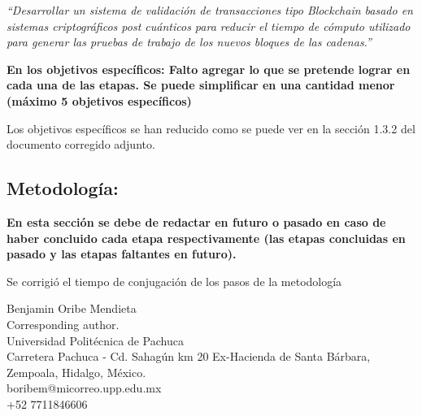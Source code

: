 \documentclass[10pt,a4paper,roman]{moderncv}        %
\begin{document}
\hfill \break 
 \textit{``Desarrollar un sistema de validación de transacciones tipo Blockchain basado en sistemas criptográficos post cuánticos para reducir el tiempo de cómputo utilizado para generar las pruebas de trabajo de los nuevos bloques de las cadenas.''}
 
\hfill \break 
\textbf{En los objetivos específicos:
Falto agregar lo que se pretende lograr en cada una de las etapas. Se puede simplificar en una cantidad menor (máximo 5 objetivos específicos)}

\hfill \break

Los objetivos específicos se han reducido como se puede ver en la sección 1.3.2 del documento corregido adjunto.

\hfill \break
\subsection{Metodología:}
\textbf{En esta sección se debe de redactar en futuro o pasado en caso de haber concluido cada etapa respectivamente (las etapas concluidas en pasado y las etapas faltantes en futuro).}

\hfill \break
Se corrigió el tiempo de conjugación de los pasos de la metodología 


\vspace{0.5cm}
Benjamin Oribe Mendieta\\
Corresponding author.\\
Universidad Politécnica de Pachuca\\
Carretera Pachuca - Cd. Sahagún km 20 Ex-Hacienda de Santa Bárbara, Zempoala, Hidalgo, México.\\ boribem@micorreo.upp.edu.mx\\
+52 7711846606\\



\end{document}
